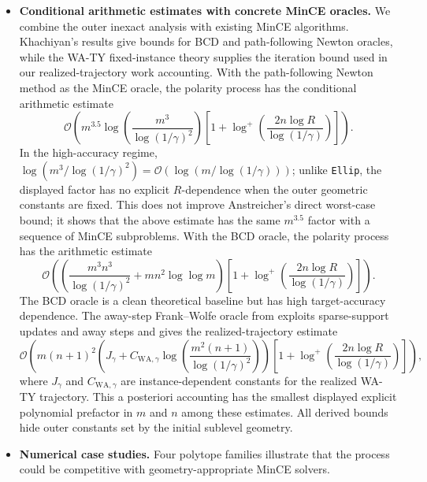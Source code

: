 \documentclass[smallextended]{svjour3}
\begin{document}
\begin{itemize}
    \item \textbf{Conditional arithmetic estimates with concrete MinCE oracles.} We combine the outer
    inexact analysis with existing MinCE algorithms. Khachiyan's results
    \cite{khachiyan1996rounding} give bounds for BCD
    and path-following Newton oracles, while the WA-TY fixed-instance theory
    \cite{ahipasaoglu2008fw} supplies the iteration bound used in our
    realized-trajectory work accounting.
    With the path-following Newton method as the MinCE
    oracle, the polarity process has the conditional arithmetic estimate
    \[
        \mathcal{O}\left(
            m^{3.5}\log\left(\frac{m^3}{\log(1/\gamma)^2}\right)
            \left[1+\log^+\left(\frac{2n\log R}{\log(1/\gamma)}\right)\right]
        \right).
    \]
    In the high-accuracy regime,
    $\log(m^3/\log(1/\gamma)^2)=\mathcal O(\log(m/\log(1/\gamma)))$; unlike
    \texttt{Ellip}, the displayed factor has no explicit $R$-dependence when the
    outer geometric constants are fixed.
    This does not improve Anstreicher's direct worst-case bound; it shows
    that the above estimate has the same
    $m^{3.5}$ factor with a sequence of MinCE
    subproblems.
    With the BCD oracle,
    the polarity process has the arithmetic estimate
    \[
        \mathcal{O}\left(
            \left(\frac{m^3n^3}{\log(1/\gamma)^2}+mn^2\log\log m\right)
            \left[1+\log^+\left(\frac{2n\log R}{\log(1/\gamma)}\right)\right]
        \right).
    \]
    The BCD oracle is a clean theoretical baseline but has high target-accuracy
    dependence. The away-step Frank--Wolfe oracle from \cite{ahipasaoglu2008fw}
    exploits sparse-support updates and away steps and gives the
    realized-trajectory estimate
    \[
        \mathcal{O}\left(
            m(n+1)^2
            \left(
                J_\gamma+
                C_{\mathrm{WA},\gamma}\log\left(\frac{m^2(n+1)}{\log(1/\gamma)^2}\right)
            \right)
            \left[1+\log^+\left(\frac{2n\log R}{\log(1/\gamma)}\right)\right]
        \right),
    \]
    where $J_\gamma$ and $C_{\mathrm{WA},\gamma}$ are instance-dependent
    constants for the realized WA-TY trajectory. This a posteriori accounting
    has the smallest displayed explicit polynomial prefactor in $m$ and $n$
    among these estimates. All derived bounds hide outer
    constants set by the initial sublevel geometry.

    \item \textbf{Numerical case studies.} Four polytope families illustrate that
    the process could be competitive with geometry-appropriate MinCE solvers.
\end{itemize}
\end{document}
